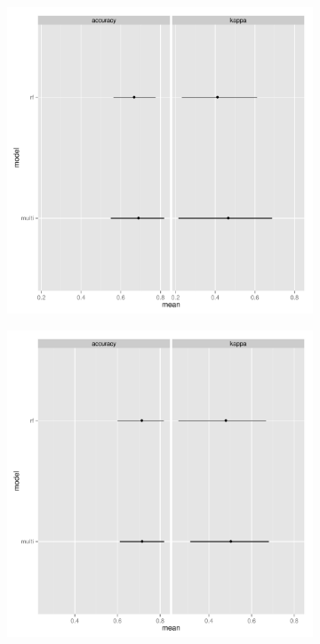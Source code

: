 \documentclass{article}\usepackage{graphicx, color}
\begin{document}
\begin{figure}[t]
  \centering
  \begin{subfigure}[b]{0.5\textwidth}
    \centering
    \caption{}
    \includegraphics[width = \textwidth]{figure/resamp1}
    \label{fig:resamp1}
  \end{subfigure}%
  \begin{subfigure}[b]{0.5\textwidth}
    \centering
    \caption{}
    \includegraphics[width = \textwidth]{figure/resamp2}
    \label{fig:resamp2}
  \end{subfigure}\\


\end{figure}
\end{document}
